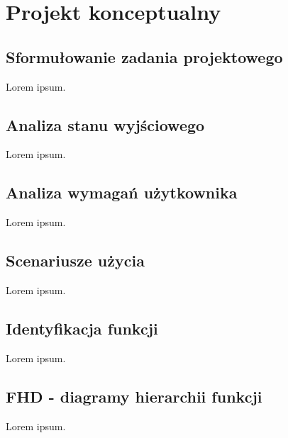 \chapter{Projekt konceptualny}
\label{cha:konceptualny}

\section{Sformułowanie zadania projektowego}
\label{sec:sforzadproj}

Lorem ipsum.


\section{Analiza stanu wyjściowego}
\label{sec:stanwyjsciowy}

Lorem ipsum.


\section{Analiza wymagań użytkownika}
\label{sec:wymagania}

Lorem ipsum.


\section{Scenariusze użycia}
\label{sec:scenariusze}

Lorem ipsum.


\section{Identyfikacja funkcji}
\label{sec:idfun}

Lorem ipsum.


\section{FHD - diagramy hierarchii funkcji}
\label{sec:FHD}

Lorem ipsum.


